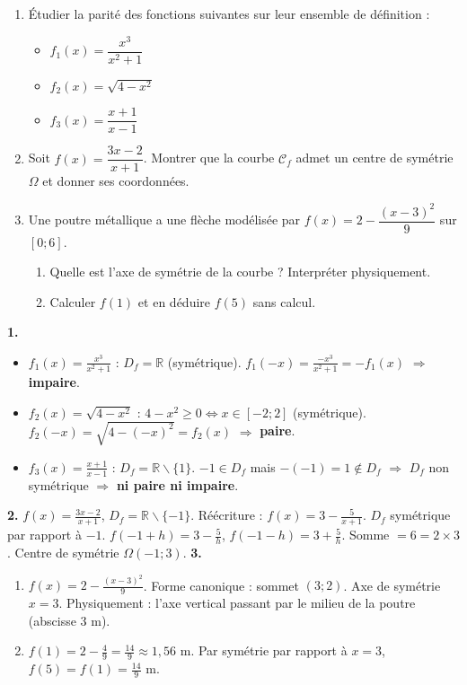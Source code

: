 \documentclass[11pt]{article}
\def\setminus{\mathbin{\backslash}}\let\smallsetminus\setminus
\begin{document}
\begin{exercice}
\begin{enumerate}
\item Étudier la parité des fonctions suivantes sur leur ensemble de définition :
      \begin{itemize}
      \item $f_1(x) = \dfrac{x^3}{x^2+1}$
      \item $f_2(x) = \sqrt{4 - x^2}$
      \item $f_3(x) = \dfrac{x+1}{x-1}$
      \end{itemize}
\item Soit $f(x) = \dfrac{3x-2}{x+1}$. Montrer que la courbe $\mathcal{C}_f$ admet un centre de symétrie $\Omega$ et donner ses coordonnées.
\item Une poutre métallique a une flèche modélisée par $f(x) = 2 - \dfrac{(x-3)^2}{9}$ sur $[0 ; 6]$.
      \begin{enumerate}
      \item Quelle est l'axe de symétrie de la courbe ? Interpréter physiquement.
      \item Calculer $f(1)$ et en déduire $f(5)$ sans calcul.
      \end{enumerate}
\end{enumerate}
\end{exercice}

\begin{corrige}[Exercice n°1]
\textbf{1.}
\begin{itemize}
\item $f_1(x) = \frac{x^3}{x^2+1}$ : $D_f = \mathbb{R}$ (symétrique). $f_1(-x) = \frac{-x^3}{x^2+1} = -f_1(x)$ $\Rightarrow$ \textbf{impaire}.
\item $f_2(x) = \sqrt{4-x^2}$ : $4-x^2 \geq 0 \iff x \in [-2;2]$ (symétrique). $f_2(-x) = \sqrt{4-(-x)^2} = f_2(x)$ $\Rightarrow$ \textbf{paire}.
\item $f_3(x) = \frac{x+1}{x-1}$ : $D_f = \mathbb{R} \setminus \{1\}$. $-1 \in D_f$ mais $-(-1)=1 \notin D_f$ $\Rightarrow$ $D_f$ non symétrique $\Rightarrow$ \textbf{ni paire ni impaire}.
\end{itemize}
\textbf{2.} $f(x) = \frac{3x-2}{x+1}$, $D_f = \mathbb{R} \setminus \{-1\}$. Réécriture : $f(x) = 3 - \frac{5}{x+1}$.
$D_f$ symétrique par rapport à $-1$. $f(-1+h) = 3 - \frac{5}{h}$, $f(-1-h) = 3 + \frac{5}{h}$.
Somme $= 6 = 2 \times 3$. Centre de symétrie $\Omega(-1 ; 3)$.
\textbf{3.}
\begin{enumerate}
\item $f(x) = 2 - \frac{(x-3)^2}{9}$. Forme canonique : sommet $(3;2)$. Axe de symétrie $x=3$. Physiquement : l'axe vertical passant par le milieu de la poutre (abscisse 3 m).
\item $f(1) = 2 - \frac{4}{9} = \frac{14}{9} \approx 1,56$ m. Par symétrie par rapport à $x=3$, $f(5) = f(1) = \frac{14}{9}$ m.
\end{enumerate}
\end{corrige}
\end{document}
